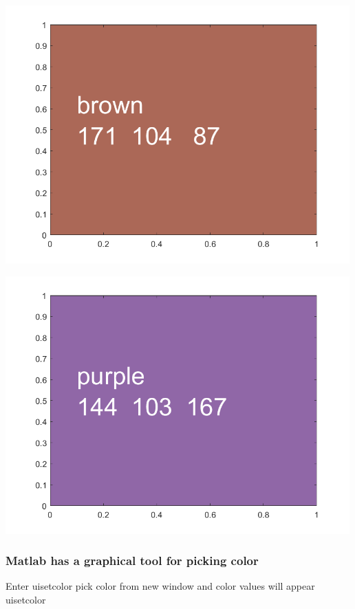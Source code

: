 \documentclass[
]{book}
\begin{document}
\includegraphics[width=5.20833in,height=\textheight]{img/fs_color_images/figure_10.png}

\includegraphics[width=5.20833in,height=\textheight]{img/fs_color_images/figure_11.png}

\hypertarget{matlab-has-a-graphical-tool-for-picking-color}{%
\subsubsection{Matlab has a graphical tool for picking color}\label{matlab-has-a-graphical-tool-for-picking-color}}

Enter uisetcolor pick color from new window and color values will appear
uisetcolor
\end{document}

